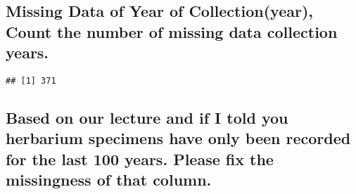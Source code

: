 \documentclass[
]{article}
\begin{document}
\hypertarget{missing-data-of-year-of-collectionyear-count-the-number-of-missing-data-collection-years.}{%
\subsection{Missing Data of Year of Collection(year), Count the number
of missing data collection
years.}\label{missing-data-of-year-of-collectionyear-count-the-number-of-missing-data-collection-years.}}

\begin{verbatim}
## [1] 371
\end{verbatim}

\hypertarget{based-on-our-lecture-and-if-i-told-you-herbarium-specimens-have-only-been-recorded-for-the-last-100-years.-please-fix-the-missingness-of-that-column.}{%
\subsection{Based on our lecture and if I told you herbarium specimens
have only been recorded for the last 100 years. Please fix the
missingness of that
column.}\label{based-on-our-lecture-and-if-i-told-you-herbarium-specimens-have-only-been-recorded-for-the-last-100-years.-please-fix-the-missingness-of-that-column.}}
\end{document}
